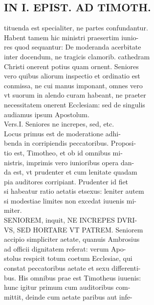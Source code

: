 \documentclass{article}
\begin{document}
\begin{pages}
\section*{IN I. EPIST. AD TIMOTH. \\
                }
tituenda est specialiter, ne partes confundantur. \\
                Habent tamem hic ministri praesertim iunio- \\
                res quod sequantur: De moderanda acerbitate \\
                inter docendum, ne tragicis clamorib. cathedram \\
                Christi onerent potius quam ornent. Seniores \\
                vero quibus aliorum inspectio et ordinatio est \\
                conmissa, ne cui manus imponant, omnes vero \\
                vt suorum in alendo curam habeant, ne praeter \\
                necessitatem onerent Ecclesiam: sed de singulis \\
                audiamus ipsum Apostolum. \\
                Vers.I. Seniores ne increpes, sed, etc. \\
                Locus primus est de moderatione adhi- \\
                benda in corripiendis peccatoribus. Proposi- \\
                tio est, Timotheo, et ob id omnibus mi- \\
                nistris, imprimis vero iunioribus opera dan- \\
                da est, vt prudenter et cum lenitate quadam \\
                pia auditores corripiant. Prudenter id fiet \\
                si habeatur ratio aetatis etsexus: leniter autem \\
                si modestiae limites non excedat iuuenis mi- \\
                miter. \\
                SENIOREM, inquit, NE INCREPES DVRI- \\
                VS, SED HORTARE VT PATREM. Seniorem \\
                accipio simpliciter aetate, quanuis Ambrosius \\
                ad officii dignitatem referat: verum Apo- \\
                stolus respicit totum coetum Ecclesiae, qui \\
                constat peccatoribus aetate et sexu differenti- \\
                bus. His omnibus prae est Timotheus iuuenis: \\
                hunc igitur primum cum auditoribus com- \\
                mittit, deinde cum aetate paribus aut infe- \\
                

\end{pages}
\end{document}
